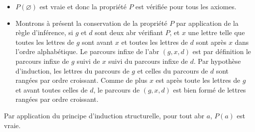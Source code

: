 \documentclass[11pt,a4paper]{article}
\begin{document}
\begin{Exercise*}[title = type A]
{\begin{itemize}
        \item $P(\varnothing)$ est vraie et donc la propriété $P$ est vérifiée pour tous les axiomes.
        \item Montrons à présent la conservation de la propriété $P$ par application de la règle d'inférence, si $g$ et $d$ sont deux {\sc abr} vérifiant $P$, et $x$ une lettre telle que toutes les lettres de $g$ sont avant $x$ et toutes les lettres de $d$ sont après $x$ dans l'ordre alphabétique. Le parcours infixe de l'{\sc abr} $(g,x,d)$ est par définition le parcours infixe de $g$ suivi de $x$ suivi du parcours infixe de $d$. Par hypothèse d'induction, les lettres du parcours de $g$ et celles du parcours de $d$ sont rangées par ordre croissant. Comme de plus $x$ est après toute les lettres de $g$ et avant toutes celles de $d$, le parcours de $(g,x,d)$ est bien formé de lettres rangées par ordre croissant.
    \end{itemize}
    Par application du principe d'induction structurelle, pour tout {\sc abr} $a$, $P(a)$ est vraie.
}
\end{Exercise*}
\end{document}
